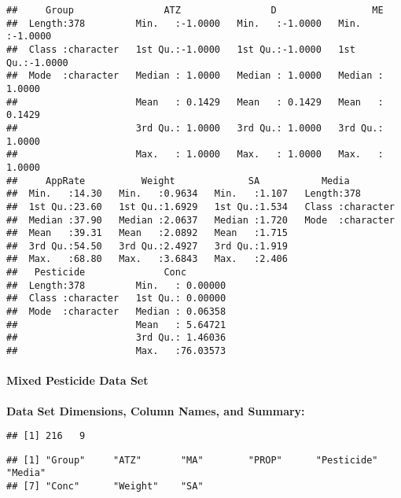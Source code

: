 \documentclass[
]{article}
\begin{document}
\begin{verbatim}
##     Group                ATZ                D                 ME         
##  Length:378         Min.   :-1.0000   Min.   :-1.0000   Min.   :-1.0000  
##  Class :character   1st Qu.:-1.0000   1st Qu.:-1.0000   1st Qu.:-1.0000  
##  Mode  :character   Median : 1.0000   Median : 1.0000   Median : 1.0000  
##                     Mean   : 0.1429   Mean   : 0.1429   Mean   : 0.1429  
##                     3rd Qu.: 1.0000   3rd Qu.: 1.0000   3rd Qu.: 1.0000  
##                     Max.   : 1.0000   Max.   : 1.0000   Max.   : 1.0000  
##     AppRate          Weight             SA           Media          
##  Min.   :14.30   Min.   :0.9634   Min.   :1.107   Length:378        
##  1st Qu.:23.60   1st Qu.:1.6929   1st Qu.:1.534   Class :character  
##  Median :37.90   Median :2.0637   Median :1.720   Mode  :character  
##  Mean   :39.31   Mean   :2.0892   Mean   :1.715                     
##  3rd Qu.:54.50   3rd Qu.:2.4927   3rd Qu.:1.919                     
##  Max.   :68.80   Max.   :3.6843   Max.   :2.406                     
##   Pesticide              Conc         
##  Length:378         Min.   : 0.00000  
##  Class :character   1st Qu.: 0.00000  
##  Mode  :character   Median : 0.06358  
##                     Mean   : 5.64721  
##                     3rd Qu.: 1.46036  
##                     Max.   :76.03573
\end{verbatim}

\hypertarget{mixed-pesticide-data-set}{%
\paragraph{\texorpdfstring{\textbf{Mixed Pesticide Data
Set}}{Mixed Pesticide Data Set}}\label{mixed-pesticide-data-set}}

\textbf{Data Set Dimensions, Column Names, and Summary:}

\begin{verbatim}
## [1] 216   9
\end{verbatim}

\begin{verbatim}
## [1] "Group"     "ATZ"       "MA"        "PROP"      "Pesticide" "Media"    
## [7] "Conc"      "Weight"    "SA"
\end{verbatim}
\end{document}
